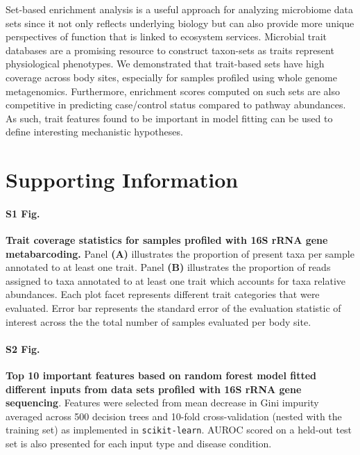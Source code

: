 \documentclass[10pt,letterpaper]{article}
\begin{document}
Set-based enrichment analysis is a useful approach for analyzing microbiome data sets since it not only reflects underlying biology but can also provide more unique perspectives of function that is linked to ecosystem services. Microbial trait databases are a promising resource to construct taxon-sets as traits represent physiological phenotypes. We demonstrated that trait-based sets have high coverage across body sites, especially for samples profiled using whole genome metagenomics. Furthermore, enrichment scores computed on such sets are also competitive in predicting case/control status compared to pathway abundances. As such, trait features found to be important in model fitting can be used to define interesting mechanistic hypotheses. 


\section*{Supporting Information}

\setcounter{figure}{0}
\renewcommand{\thefigure}{S\arabic{figure}}
\paragraph*{S1 Fig.}
\label{S1_Fig}
{\bf Trait coverage statistics for samples profiled with 16S rRNA gene metabarcoding.} Panel \textbf{(A)} illustrates the proportion of present taxa per sample annotated to at least one trait. Panel \textbf{(B)} illustrates the proportion of reads assigned to taxa annotated to at least one trait which accounts for taxa relative abundances. Each plot facet represents different trait categories that were evaluated. Error bar represents the standard error of the evaluation statistic of interest across the the total number of samples evaluated per body site.

\paragraph*{S2 Fig.}
\label{S2_Fig}
{\bf Top 10 important features based on random forest model fitted different inputs from data sets profiled with 16S rRNA gene sequencing}. Features were selected from mean decrease in Gini impurity averaged across 500 decision trees and 10-fold cross-validation (nested with the training set) as implemented in \texttt{scikit-learn}. AUROC scored on a held-out test set is also presented for each input type and disease condition.
\end{document}
